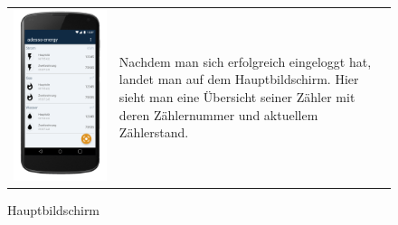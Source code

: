 \begin{figure}[h]
\begin{tabularx}{\textwidth}{X  X}
	\includegraphics[scale = 0.155]{img/AndroidMockup/Main} \caption{Hauptbildschirm} & Nachdem man sich erfolgreich eingeloggt hat, landet man auf dem Hauptbildschirm. Hier sieht man eine Übersicht seiner Zähler mit deren Zählernummer und aktuellem Zählerstand. \\
\end{tabularx}
\end{figure}


